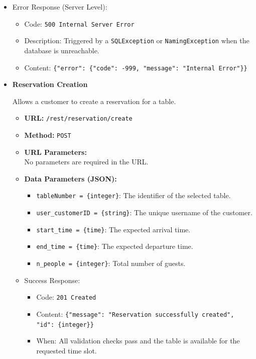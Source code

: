 \documentclass[a4paper]{article}
\begin{document}
\begin{itemize}
    \item Error Response (Server Level):
\begin{itemize}
    \item{Code}: \texttt{500 Internal Server Error}
    \item{Description}: Triggered by a \texttt{SQLException} or \texttt{NamingException} when the database is unreachable. 
    \item{Content}: \texttt{\{"error": \{"code": -999, "message": "Internal Error"\}\}}
\end{itemize}


    
   
    \item \textbf{Reservation Creation}

    Allows a customer to create a reservation for a table.
    
    \begin{itemize}
    \item
      \textbf{URL:} \texttt{/rest/reservation/create}
    \item
      \textbf{Method:} \texttt{POST}
    \item
      \textbf{URL Parameters:}\\
      No parameters are required in the URL.

    \item \textbf{Data Parameters (JSON):}
    \begin{itemize}
        \item \texttt{tableNumber = \{integer\}}: The identifier of the selected table.
        \item \texttt{user\_customerID = \{string\}}: The unique username of the customer.
        \item \texttt{start\_time = \{time\}}: The expected arrival time.
        \item \texttt{end\_time = \{time\}}: The expected departure time.
        \item \texttt{n\_people = \{integer\}}: Total number of guests.
    \end{itemize}

\item Success Response:
    \begin{itemize}
        \item{Code}: \texttt{201 Created}
        \item{Content}: \texttt{\{"message": "Reservation successfully created", "id": \{integer\}\}}
        \item {When}: All validation checks pass and the table is available for the requested time slot.
    \end{itemize}


\end{itemize}
\end{itemize}
\end{document}
